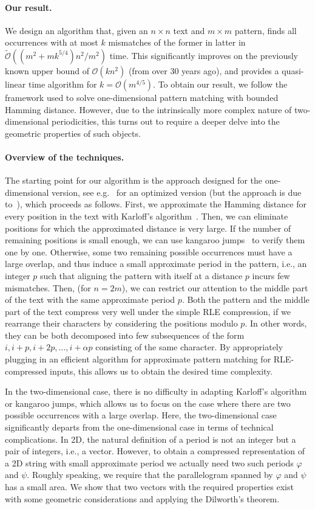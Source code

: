 \documentclass[11pt, letterpaper]{article}
\theoremstyle{plain}
\theoremstyle{definition}
\theoremstyle{remark}
\renewcommand{\O}{\mathcal{O}}
\newcommand{\tO}{\tilde{\mathcal{O}}}
\renewcommand{\phi}{\varphi}
\begin{document}
\paragraph{Our result.} We design an algorithm that, given an $n\times n$ text and $m\times m$ pattern, finds
all occurrences with at most $k$ mismatches of the former in latter in $\tO((m^2 + mk^{5/4})n^2 / m^2)$ time.
This significantly improves on the previously known upper bound of $\O(kn^{2})$ (from over 30 years ago),
and provides a quasi-linear time algorithm for $k=\O(m^{4/5})$. To obtain our result, we follow the framework
used to solve one-dimensional pattern matching with bounded Hamming distance. However, due to the intrinsically
more complex nature of two-dimensional periodicities, this turns out to require a deeper delve into the geometric
properties of such objects.

\paragraph{Overview of the techniques.}
The starting point for our algorithm is the approach designed for the one-dimensional version, see e.g.~\cite{Gawrychowski2018}
for an optimized version (but the approach is due to~\cite{Clifford2015}), which proceeds as follows.
First, we approximate the Hamming distance for every position in the text with Karloff's algorithm~\cite{Karloff1993}.
Then, we can eliminate positions for which the approximated distance is very large.
If the number of remaining positions is small enough, we can use kangaroo jumps~\cite{Galil1986} to verify them one by one.
Otherwise, some two remaining possible occurrences must have a large overlap, and thus induce a small approximate period in the pattern, i.e., an integer $p$ such that aligning the pattern with itself at a distance $p$ incurs few mismatches.
Then, (for $n=2m$), we can restrict our attention to the middle part of the text with the same approximate period $p$.
Both the pattern and the middle part of the text compress very well under the simple RLE compression, if we rearrange their characters
by considering the positions modulo $p$. In other words, they can be both decomposed into few subsequences
of the form $i, i+p, i+2p, \ldots, i+\alpha p$ consisting of the same character.
By appropriately plugging in an efficient algorithm for approximate pattern
matching for RLE-compressed inputs, this allows us to obtain the desired time complexity.

In the two-dimensional case, there is no difficulty in adapting Karloff's algorithm or kangaroo jumps, which allows
us to focus on the case where there are two possible occurrences with a large overlap. Here, the two-dimensional
case significantly departs from the one-dimensional case in terms of technical complications. In 2D,
the natural definition of a period is not an integer but a pair of integers, i.e., a vector.
However, to obtain a compressed representation of
a 2D string with small approximate period we actually need two such periods $\phi$ and $\psi$.
Roughly speaking, we require that the parallelogram spanned by $\phi$ and $\psi$ has a small area.
We show that two vectors with the required properties exist with some geometric considerations and
applying the Dilworth's theorem.
\end{document}
